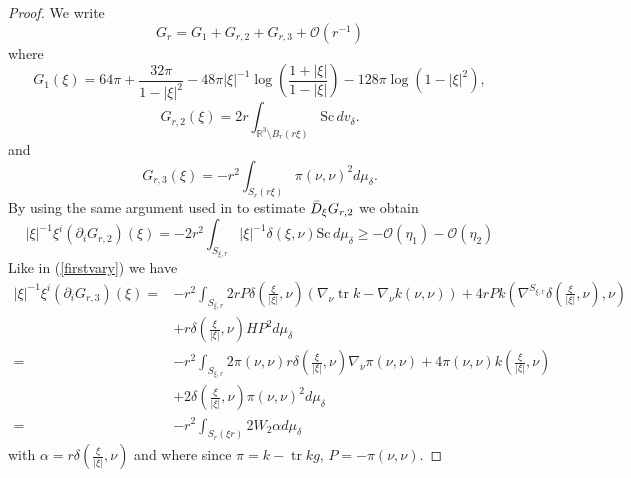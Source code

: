 \documentclass[12pt,a4paper]{amsart}
\theoremstyle{plain}
\theoremstyle{definition}
\newcommand{\tr}{\operatorname{tr}}
\begin{document}
\begin{proof}
    We write
\[
G_r = G_1 + G_{r,2}+G_{r,3} + \mathcal{O} (r^{-1})
\]
where
\[
G_1(\xi) = 64 \pi + \frac{32 \pi}{1 - |\xi|^2} - 48 \pi |\xi|^{-1} \log \left( \frac{1 + |\xi|}{1 - |\xi|} \right) - 128 \pi \log(1 - |\xi|^2),
\]
\[
G_{r,2}(\xi) = 2 r \int_{\mathbb{R}^3 \setminus B_r(r \xi)} \mathrm{Sc} \, dv_\delta.
\]
and 
$$G_{r,3}(\xi)= -r^2 \int_{S_r(r \xi)} \pi(\nu,\nu)^2 d\mu_\delta.  $$
By using the same argument used in \cite[Lemma 24]{eichko} to estimate $\Bar{D}_\xi G_{r,2}$ we obtain
 \begin{equation}\label{tayexpsc}
       |\xi|^{-1} \xi^i (\partial_i G_{r,2})(\xi) = -2 r^2 \int_{S_{\xi, r}} |\xi|^{-1} \delta( \xi, \nu ) \mathrm{Sc} \, d\mu_\delta\geq -\mathcal{O}(\eta_1) -\mathcal{O}(\eta_2) 
 \end{equation}
 Like in (\ref{firstvary}) we have 
\begin{equation}
\begin{split}
    |\xi|^{-1} \xi^i (\partial_i G_{r,3})(\xi) =& - r^2 \int_{S_{\xi,r}} 2 rP  \delta( \frac{\xi}{|\xi|}, \nu ) ( \nabla_{\nu} \tr k - \nabla_{\nu} k(\nu,\nu )) +4r P    k(\nabla^{S_{\xi,r}} \delta( \frac{\xi}{|\xi|}, \nu ), \nu )\\
   &+ r \delta( \frac{\xi}{|\xi|}, \nu ) H P^2  d\mu_\delta\\
   =&-r^2 \int_{S_{\xi,r}} 2 \pi(\nu, \nu) r \delta( \frac{\xi}{|\xi|}, \nu ) \nabla_{\nu}\pi(\nu,\nu) +4 \pi(\nu, \nu)    k( \frac{\xi}{|\xi|} , \nu )\\
   &+ 2 \delta( \frac{\xi}{|\xi|}, \nu )  \pi(\nu, \nu)^2  d\mu_\delta\\
   =&-r^2 \int_{S_{r}(\xi r)}  2 W_2 \alpha d\mu_\delta
   \end{split}
\end{equation}
with $ \alpha= r \delta( \frac{\xi}{|\xi|}, \nu ) $ and where since $\pi = k-\tr k g$, $P=-\pi(\nu, \nu)$.





\end{proof}
\end{document}
